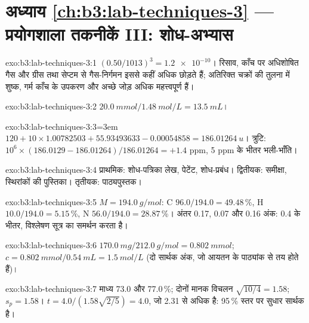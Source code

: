 \section*{अध्याय \ref{ch:b3:lab-techniques-3} --- प्रयोगशाला तकनीकें III: शोध-अभ्यास}

\begin{solution}{exo:b3:lab-techniques-3:1}
$(0.50/1013)^3 = \num{1.2e-10}$। रिसाव, काँच पर अधिशोषित गैस और ग्रीस तथा सेप्टम से गैस-निर्गमन
इससे कहीं अधिक छोड़ते हैं; अतिरिक्त चक्रों की तुलना में शुष्क, गर्म काँच के उपकरण और अच्छे जोड़
अधिक महत्त्वपूर्ण हैं।
\end{solution}

\begin{solution}{exo:b3:lab-techniques-3:2}
$\qty{20.0}{mmol}/\qty{1.48}{mol/L} = \qty{13.5}{mL}$।
\end{solution}

\begin{solution}{exo:b3:lab-techniques-3:3}\emergencystretch=3em
$120 + 10 \times 1.00782503 + 55.93493633 - 0.00054858 = \qty{186.01264}{u}$। त्रुटि: $10^6 \times (186.0129 - 186.01264)/186.01264 = +1.4$ ppm,
5 ppm के भीतर भली-भाँति।
\end{solution}

\begin{solution}{exo:b3:lab-techniques-3:4}
प्राथमिक: शोध-पत्रिका लेख, पेटेंट, शोध-प्रबंध। द्वितीयक: समीक्षा,
स्थिरांकों की पुस्तिका। तृतीयक: पाठ्यपुस्तक।
\end{solution}

\begin{solution}{exo:b3:lab-techniques-3:5}
$M = \qty{194.0}{g/mol}$: C $96.0/194.0 = 49.48$\,\%, H $10.0/194.0 = 5.15$\,\%, N $56.0/194.0 = 28.87$\,\%। अंतर 0.17, 0.07 और 0.16
अंक: 0.4 के भीतर, विश्लेषण सूत्र का समर्थन करता है।
\end{solution}

\begin{solution}{exo:b3:lab-techniques-3:6}
$\qty{170.0}{mg}/\qty{212.0}{g/mol} = \qty{0.802}{mmol}$; $c = \qty{0.802}{mmol}/\qty{0.54}{mL} = \qty{1.5}{mol/L}$ (दो सार्थक अंक, जो आयतन के
पाठ्यांक से तय होते हैं)।
\end{solution}

\begin{solution}{exo:b3:lab-techniques-3:7}
माध्य 73.0 और 77.0\,\%; दोनों मानक विचलन $\sqrt{10/4} = 1.58$; $s_p = 1.58$। $t = 4.0/(1.58\sqrt{2/5}) = 4.0$, जो
2.31 से अधिक है: 95\,\% स्तर पर सुधार सार्थक है।
\end{solution}

